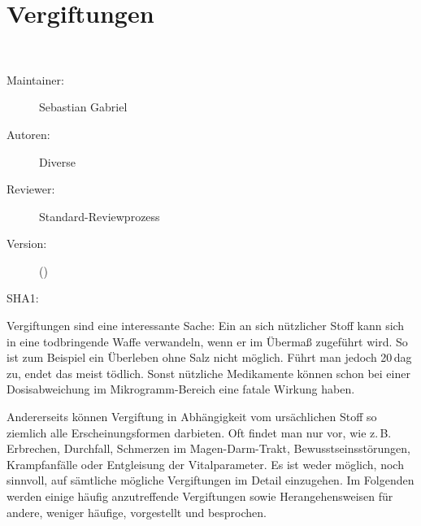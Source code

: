 \def\ChapterCode{TOX}
\chapter
[\CO{[TOX]} Vergiftungen]
{Vergiftungen}
\ChapterIntro
{%
~~~
}
{%
\begin{description}
  \item[Maintainer:] Sebastian Gabriel
  \item[Autoren:] Diverse
  \item[Reviewer:] Standard-Reviewprozess
  \item[Version:] {\VarDocVersionTypeName} ({\VarDocVersionTypeDescription})
  \item[SHA1:] {\DocGitCommit}
\end{description}

{\TxTeilkapitelAASS}
}
\label{topic:vergiftung}



\clearpage


\Text
{{\TxBeschreibung}}%
{%
Vergiftungen sind eine interessante Sache: Ein an sich
nützlicher Stoff kann sich in eine todbringende Waffe
verwandeln, wenn er im Übermaß zugeführt wird. So ist zum
Beispiel ein Überleben ohne Salz nicht möglich. Führt man
jedoch 20\,dag zu, endet das meist tödlich. Sonst nützliche
Medikamente können schon bei einer Dosisabweichung im
Mikrogramm-Bereich eine fatale Wirkung haben.

Andererseits können Vergiftung in Abhängigkeit vom
ursächlichen Stoff so ziemlich alle Erscheinungsformen
darbieten. Oft findet man nur 
vor, wie z.\,B. Erbrechen, Durchfall, Schmerzen im
Magen-Darm-Trakt, Bewusstseinsstörungen, Krampfanfälle oder
Entgleisung der Vitalparameter.
Es ist weder möglich, noch sinnvoll, auf sämtliche mögliche
Vergiftungen im Detail einzugehen. Im Folgenden werden
einige häufig anzutreffende Vergiftungen sowie
Herangehensweisen für andere, weniger häufige, vorgestellt
und besprochen. 
}%






